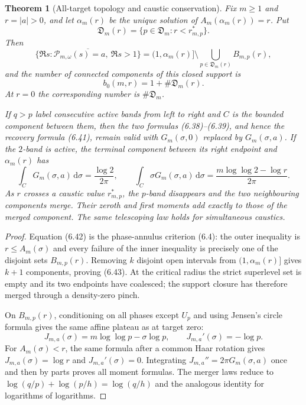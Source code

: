 \documentclass[11pt]{article}
\newtheorem{theorem}{Theorem}[section]
\theoremstyle{definition}
\theoremstyle{remark}
\newcommand{\cP}{\mathcal P}
\newcommand{\dd}{\,\mathrm d}
\begin{document}
\begin{theorem}[All-target topology and caustic conservation]
\label{thm:all-target-band-topology}
Fix $m\ge1$ and $r=|a|>0$, and let $\alpha_m(r)$ be the unique solution of
$A_m(\alpha_m(r))=r$.  Put
\[
 \mathfrak D_m(r)=\{p\in\mathfrak D_m:r<r^*_{m,p}\}.
\]
Then
\[
 \boxed{
 \overline{\{\Re s:\cP_{m,\omega}(s)=a,\ \Re s>1\}}
 =(1,\alpha_m(r)]\setminus
 \bigcup_{p\in\mathfrak D_m(r)}B_{m,p}(r),}
\tag{6.42}
\]
and the number of connected components of this closed support is
\[
 \boxed{b_0(m,r)=1+\#\mathfrak D_m(r).}
\tag{6.43}
\]
At $r=0$ the corresponding number is $\#\mathfrak D_m$.

If $q>p$ label consecutive active bands from left to right and $C$ is the
bounded component between them, then the two formulas (6.38)--(6.39), and hence
the recovery formula (6.41), remain valid with $G_m(\sigma,0)$ replaced by
$G_m(\sigma,a)$.  If the $2$-band is active, the terminal component between its
right endpoint and $\alpha_m(r)$ has
\[
 \int_CG_m(\sigma,a)\dd\sigma=\frac{\log2}{2\pi},
 \qquad
 \int_C\sigma G_m(\sigma,a)\dd\sigma
 =\frac{m\log\log2-\log r}{2\pi}.
\tag{6.44}
\]
As $r$ crosses a caustic value $r^*_{m,p}$, the $p$-band disappears and the two
neighbouring components merge.  Their zeroth and first moments add exactly to
those of the merged component.  The same telescoping law holds for simultaneous
caustics.
\end{theorem}

\begin{proof}
Equation (6.42) is the phase-annulus criterion (6.4): the outer inequality is
$r\le A_m(\sigma)$ and every failure of the inner inequality is precisely one of
the disjoint sets $B_{m,p}(r)$.  Removing $k$ disjoint open intervals from
$(1,\alpha_m(r)]$ gives $k+1$ components, proving (6.43).  At the critical radius
the strict superlevel set is empty and its two endpoints have coalesced; the
support closure has therefore merged through a density-zero pinch.

On $B_{m,p}(r)$, conditioning on all phases except $U_p$ and using Jensen's
circle formula gives the same affine plateau as at target zero:
\[
 J_{m,a}(\sigma)=m\log\log p-\sigma\log p,
 \qquad J_{m,a}'(\sigma)=-\log p.
\]
For $A_m(\sigma)<r$, the same formula after a common Haar rotation gives
$J_{m,a}(\sigma)=\log r$ and $J_{m,a}'(\sigma)=0$.  Integrating
$J_{m,a}''=2\pi G_m(\sigma,a)$ once and then by parts proves all moment
formulas.  The merger laws reduce to
$\log(q/p)+\log(p/h)=\log(q/h)$ and the analogous identity for logarithms of
logarithms.
\end{proof}
\end{document}
